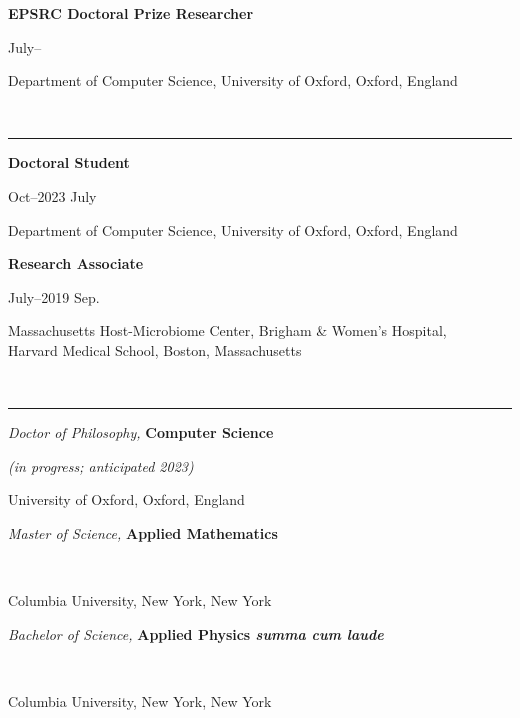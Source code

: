 \documentclass[11pt]{article}
\begin{document}
\noindent\parbox{.65\textwidth}{\raggedright  \textbf{EPSRC Doctoral Prize Researcher}}
\parbox{.35\textwidth}{ July--}
Department of Computer Science, University of Oxford, Oxford, England

\vspace{0.6cm}




\vspace{-2.75mm} \\
\rule{\textwidth}{0.4pt}
\vspace{0.1mm}
\noindent\parbox{.65\textwidth}{\raggedright  \textbf{Doctoral Student}}
\parbox{.35\textwidth}{ Oct--2023 July}
Department of Computer Science, University of Oxford, Oxford, England


\vspace{0.4cm}

\noindent\parbox{.75\textwidth}{\raggedright \textbf{Research Associate}}
\parbox{.25\textwidth}{ July--2019 Sep.}
Massachusetts Host-Microbiome Center, Brigham \& Women's Hospital,\\ Harvard Medical School, Boston, Massachusetts




\vspace{0.6cm}


\vspace{-2.75mm} \\
\rule{\textwidth}{0.4pt}
\vspace{0.1mm}
\noindent\parbox{.65\textwidth}{\raggedright \textit{{D}octor of Philosophy,} \textbf{Computer Science}}
\parbox{.35\textwidth}{\raggedleft \emph{(in progress; anticipated 2023)}}
University of Oxford, Oxford, England

\vspace{0.4cm}

\noindent\parbox{.75\textwidth}{\raggedright \textit{Master of Science,} \textbf{Applied Mathematics}}
\parbox{.25\textwidth}{\raggedleft  ~}
Columbia University, New York, New York


\vspace{0.4cm}

\noindent\parbox{.75\textwidth}{\raggedright \emph{Bachelor of Science,} \textbf{Applied Physics \emph{summa cum laude}}}
\parbox{.25\textwidth}{\raggedleft  ~}
Columbia University, New York, New York
\end{document}
